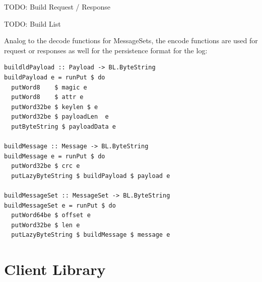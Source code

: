 TODO: Build Request / Response

TODO: Build List 

Analog to the decode functions for MessageSets, the encode functions are
used for request or responses as well for the persistence format for the log:

\begin{lstlisting}
buildldPayload :: Payload -> BL.ByteString 
buildPayload e = runPut $ do 
  putWord8    $ magic e
  putWord8    $ attr e
  putWord32be $ keylen $ e
  putWord32be $ payloadLen  e
  putByteString $ payloadData e

buildMessage :: Message -> BL.ByteString
buildMessage e = runPut $ do 
  putWord32be $ crc e
  putLazyByteString $ buildPayload $ payload e 

buildMessageSet :: MessageSet -> BL.ByteString
buildMessageSet e = runPut $ do 
  putWord64be $ offset e
  putWord32be $ len e
  putLazyByteString $ buildMessage $ message e
\end{lstlisting}

\section{Client Library}

